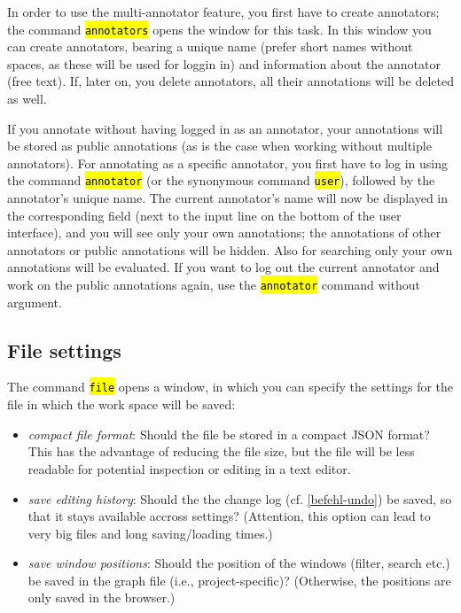 \documentclass[12pt]{scrartcl}
\newcommand{\code}[1]{\hl{\texttt{#1}}}
\begin{document}
In order to use the multi-annotator feature, you first have to create annotators; the command \code{annotators} opens the window for this task.
In this window you can create annotators, bearing a unique name (prefer short names without spaces, as these will be used for loggin in) and information about the annotator (free text).
If, later on, you delete annotators, all their annotations will be deleted as well.

If you annotate without having logged in as an annotator, your annotations will be stored as public annotations (as is the case when working without multiple annotators).
For annotating as a specific annotator, you first have to log in using the command \code{annotator} (or the synonymous command \code{user}), followed by the annotator’s unique name.
The current annotator’s name will now be displayed in the corresponding field (next to the input line on the bottom of the user interface), and you will see only your own annotations; the annotations of other annotators or public annotations will be hidden.
Also for searching only your own annotations will be evaluated.
If you want to log out the current annotator and work on the public annotations again, use the \code{annotator} command without argument.


\subsection{File settings}\label{filesettings}

The command \code{file} opens a window, in which you can specify the settings for the file in which the work space will be saved:

\begin{itemize}
	\item	\textit{compact file format}: Should the file be stored in a compact JSON format?
			This has the advantage of reducing the file size, but the file will be less readable for potential inspection or editing in a text editor.
	\item	\textit{save editing history}: Should the the change log (cf. \ref{befehl-undo}) be saved, so that it stays available accross settings?
			(Attention, this option can lead to very big files and long saving/loading times.)
	\item	\textit{save window positions}: Should the position of the windows (filter, search etc.) be saved in the graph file (i.e., project-specific)?
			(Otherwise, the positions are only saved in the browser.)
\end{itemize}
\end{document}
